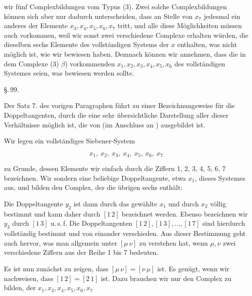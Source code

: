 wir fünf Complexbildungen vom Typus (3). Zwei solche Complexbildungen können sich aber nur dadurch unterscheiden, dass an Stelle von $x_7$ jedesmal ein anderes der Elemente $x_3, x_4, x_5, x_6, x_7$ tritt, und alle diese Möglichkeiten müssen auch vorkommen, weil wir sonst zwei verschiedene Complexe erhalten würden, die dieselben sechs Elemente des vollständigen Systems der $x$ enthalten, was nicht möglich ist, wie wir bewiesen haben. Demnach können wir annehmen, dass die in dem Complexe (3) $\beta$) vorkommenden $x_1, x_2, x_3, x_4, x_5, x_6$  des vollständigen Systemes seien, was bewiesen werden sollte.

\S.\,99.


Der Satz 7. des vorigen Paragraphen führt zu einer Bezeichnungsweise für die Doppeltangenten, durch die eine sehr übersichtliche Darstellung aller dieser Verhältnisse möglich ist, die von  (im Anschluss an ) ausgebildet ist.

Wir legen ein vollständiges Siebener-System

\[ x_1,\ x_2,\ x_3,\ x_4,\ x_5,\ x_6,\ x_7 \]

zu Grunde, dessen Elemente wir einfach durch die Ziffern 1, 2, 3, 4, 5, 6, 7 bezeichnen. Wir sondern eine beliebige Doppeltangente, etwa $x_1$, dieses Systemes aus, und bilden den Complex, der die übrigen sechs enthält:


Die Doppeltangente $y_2$ ist dann durch das gewählte $x_1$ und durch $x_2$ völlig bestimmt und kann daher durch $[1\,2]$ bezeichnet werden. Ebenso bezeichnen wir $y_3$ durch $[1\,3]$ u.\,s.\,f. Die Doppeltangenten $[1\,2], [1\,3], \dots, [1\,7]$ sind hierdurch vollständig bestimmt und von einander verschieden. Aus dieser Bestimmung geht auch hervor, was man allgemein unter $[\mu\,\nu]$ zu verstehen hat, wenn $\mu, \nu$ zwei verschiedene Ziffern aus der Reihe 1 bis 7 bedeuten.

Es ist nun zunächst zu zeigen, dass $[\mu\,\nu] = [\nu\,\mu]$ ist. Es genügt, wenn wir nachweisen, dass $[1\,2] = [2\,1]$ ist. Dazu brauchen wir nur den Complex zu bilden, der $x_1, x_3, x_4, x_5, x_6, x_7$
